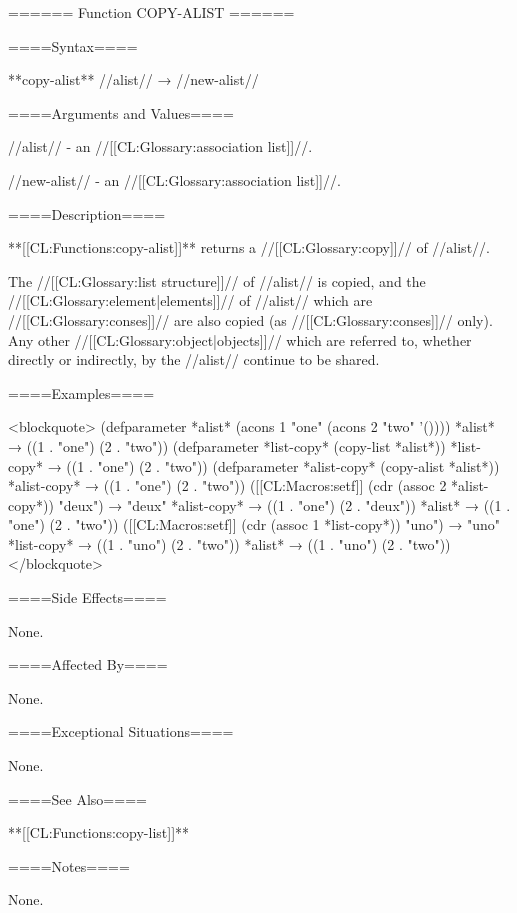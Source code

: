 ====== Function COPY-ALIST ======

====Syntax====

**copy-alist** //alist// → //new-alist//

====Arguments and Values====

//alist// - an //[[CL:Glossary:association list]]//.

//new-alist// - an //[[CL:Glossary:association list]]//.

====Description====

**[[CL:Functions:copy-alist]]** returns a //[[CL:Glossary:copy]]// of //alist//.

The //[[CL:Glossary:list structure]]// of //alist// is copied, and the //[[CL:Glossary:element|elements]]// of //alist// which are //[[CL:Glossary:conses]]// are also copied (as //[[CL:Glossary:conses]]// only). Any other //[[CL:Glossary:object|objects]]// which are referred to, whether directly or indirectly, by the //alist// continue to be shared.

====Examples====

<blockquote> (defparameter *alist* (acons 1 "one" (acons 2 "two" '()))) *alist* → ((1 . "one") (2 . "two")) (defparameter *list-copy* (copy-list *alist*)) *list-copy* → ((1 . "one") (2 . "two")) (defparameter *alist-copy* (copy-alist *alist*)) *alist-copy* → ((1 . "one") (2 . "two")) ([[CL:Macros:setf]] (cdr (assoc 2 *alist-copy*)) "deux") → "deux" *alist-copy* → ((1 . "one") (2 . "deux")) *alist* → ((1 . "one") (2 . "two")) ([[CL:Macros:setf]] (cdr (assoc 1 *list-copy*)) "uno") → "uno" *list-copy* → ((1 . "uno") (2 . "two")) *alist* → ((1 . "uno") (2 . "two")) </blockquote>

====Side Effects====

None.

====Affected By====

None.

====Exceptional Situations====

None.

====See Also====

**[[CL:Functions:copy-list]]**

====Notes====

None.

